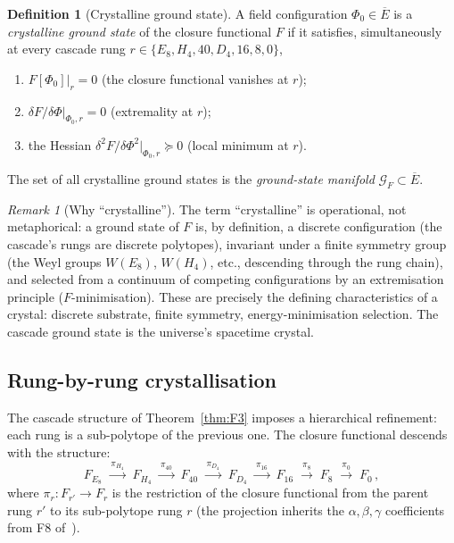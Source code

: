 \documentclass[11pt]{article}
\theoremstyle{plain}
\theoremstyle{definition}
\newtheorem{definition}[theorem]{Definition}
\theoremstyle{remark}
\newtheorem{remark}[theorem]{Remark}
\begin{document}
\begin{definition}[Crystalline ground state]\label{def:crystal-ground}
A field configuration $\Phi_0 \in \overline{E}$ is a \emph{crystalline ground state} of the closure functional $F$ if it satisfies, simultaneously at every cascade rung $r \in \{E_8, H_4, 40, D_4, 16, 8, 0\}$,
\begin{enumerate}[label=\textup{(\arabic*)}, leftmargin=2em]
\item $F[\Phi_0]\bigr|_r = 0$ (the closure functional vanishes at $r$);
\item $\delta F / \delta \Phi\bigr|_{\Phi_0, r} = 0$ (extremality at $r$);
\item the Hessian $\delta^2 F / \delta \Phi^2\bigr|_{\Phi_0, r} \succeq 0$ (local minimum at $r$).
\end{enumerate}
The set of all crystalline ground states is the \emph{ground-state manifold} $\mathcal{G}_F \subset \overline{E}$.
\end{definition}

\begin{remark}[Why ``crystalline'']
The term ``crystalline'' is operational, not metaphorical: a ground state of $F$ is, by definition, a discrete configuration (the cascade's rungs are discrete polytopes), invariant under a finite symmetry group (the Weyl groups $W(E_8)$, $W(H_4)$, etc., descending through the rung chain), and selected from a continuum of competing configurations by an extremisation principle ($F$-minimisation). These are precisely the defining characteristics of a crystal: discrete substrate, finite symmetry, energy-minimisation selection. The cascade ground state is the universe's spacetime crystal.
\end{remark}

\subsection{Rung-by-rung crystallisation}\label{sec:cry-rung}

The cascade structure of Theorem~\ref{thm:F3} imposes a hierarchical refinement: each rung is a sub-polytope of the previous one. The closure functional descends with the structure:
\begin{equation}\label{eq:rung-descent}
  F_{E_8} \;\xrightarrow{\,\pi_{H_4}\,}\; F_{H_4} \;\xrightarrow{\,\pi_{40}\,}\; F_{40} \;\xrightarrow{\,\pi_{D_4}\,}\; F_{D_4} \;\xrightarrow{\,\pi_{16}\,}\; F_{16} \;\xrightarrow{\,\pi_8\,}\; F_8 \;\xrightarrow{\,\pi_0\,}\; F_0 \,,
\end{equation}
where $\pi_r: F_{r'} \to F_r$ is the restriction of the closure functional from the parent rung $r'$ to its sub-polytope rung $r$ (the projection inherits the $\alpha, \beta, \gamma$ coefficients from F8 of~\citealp{SmartXXXVI}).
\end{document}
